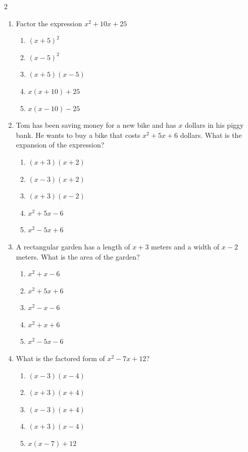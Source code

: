 \documentclass[10pt]{article}
\begin{document}
\begin{multicols}{2}
\begin{enumerate}[label=\textbf{Q\arabic*.}, leftmargin=*, itemsep=6pt, parsep=0pt]
  \item \small Factor the expression $x^2 + 10x + 25$
  \begin{enumerate}[label=(\Alph*), leftmargin=0.6cm, nosep, itemsep=2pt]
    \item $(x + 5)^2$
    \item $(x - 5)^2$
    \item $(x + 5)(x - 5)$
    \item $x(x + 10) + 25$
    \item $x(x - 10) - 25$
  \end{enumerate}

  \item \small Tom has been saving money for a new bike and has $x$ dollars in his piggy bank. He wants to buy a bike that costs $x^2 + 5x + 6$ dollars. What is the expansion of the expression?
  \begin{enumerate}[label=(\Alph*), leftmargin=0.6cm, nosep, itemsep=2pt]
    \item $(x + 3)(x + 2)$
    \item $(x - 3)(x + 2)$
    \item $(x + 3)(x - 2)$
    \item $x^2 + 5x - 6$
    \item $x^2 - 5x + 6$
  \end{enumerate}

  \item \small A rectangular garden has a length of $x + 3$ meters and a width of $x - 2$ meters. What is the area of the garden?
  \begin{enumerate}[label=(\Alph*), leftmargin=0.6cm, nosep, itemsep=2pt]
    \item $x^2 + x - 6$
    \item $x^2 + 5x + 6$
    \item $x^2 - x - 6$
    \item $x^2 + x + 6$
    \item $x^2 - 5x - 6$
  \end{enumerate}

  \item \small What is the factored form of $x^2 - 7x + 12$?
  \begin{enumerate}[label=(\Alph*), leftmargin=0.6cm, nosep, itemsep=2pt]
    \item $(x - 3)(x - 4)$
    \item $(x + 3)(x + 4)$
    \item $(x - 3)(x + 4)$
    \item $(x + 3)(x - 4)$
    \item $x(x - 7) + 12$
  \end{enumerate}


\end{enumerate}
\end{multicols}
\end{document}
